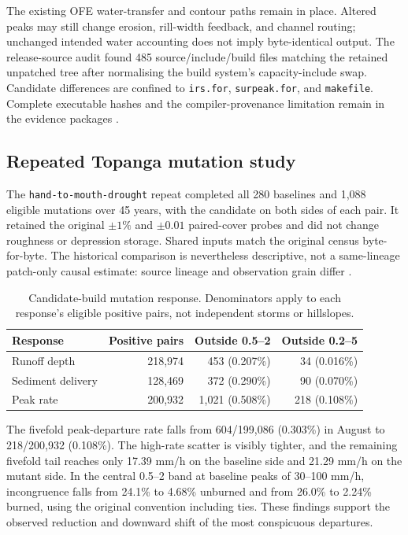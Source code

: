 The existing OFE water-transfer and contour paths remain in place. Altered
peaks may still change erosion, rill-width feedback, and channel routing;
unchanged intended water accounting does not imply byte-identical output.
The release-source audit found 485 source/include/build files matching the
retained unpatched tree after normalising the build system's capacity-include
swap. Candidate differences are confined to \texttt{irs.for},
\texttt{surpeak.for}, and \texttt{makefile}. Complete executable hashes and
the compiler-provenance limitation remain in the evidence packages
\cite{mutationredo,rrlegacy}.

\subsection{Repeated Topanga mutation study}

The \texttt{hand-to-mouth-drought} repeat completed all 280 baselines and
1,088 eligible mutations over 45 years, with the candidate on both sides of
each pair. It retained the original $\pm1\%$ \Ksat{} and $\pm0.01$ paired-cover
probes and did not change roughness or depression storage. Shared inputs match
the original census byte-for-byte. The historical comparison is nevertheless
descriptive, not a same-lineage patch-only causal estimate: source lineage and
observation grain differ \cite{mutationredo}.

\begin{table}[H]
\centering\small
\caption{Candidate-build mutation response. Denominators apply to each
response's eligible positive pairs, not independent storms or hillslopes.}
\begin{tabular}{lrrr}
\toprule
Response & Positive pairs & Outside 0.5--2 & Outside 0.2--5 \\
\midrule
Runoff depth & 218,974 & 453 (0.207\%) & 34 (0.016\%) \\
Sediment delivery & 128,469 & 372 (0.290\%) & 90 (0.070\%) \\
Peak rate & 200,932 & 1,021 (0.508\%) & 218 (0.108\%) \\
\bottomrule
\end{tabular}
\end{table}

The fivefold peak-departure rate falls from 604/199,086 (0.303\%) in August
to 218/200,932 (0.108\%). The high-rate scatter is visibly tighter, and the
remaining fivefold tail reaches only 17.39 mm/h on the baseline side and
21.29 mm/h on the mutant side. In the central 0.5--2 band at baseline peaks
of 30--100 mm/h, \Ksat{} incongruence falls from 24.1\% to 4.68\% unburned
and from 26.0\% to 2.24\% burned, using the original convention including ties.
These findings support the observed reduction and downward shift of the most
conspicuous departures.

